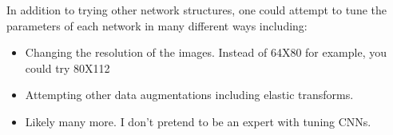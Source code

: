 \documentclass[letterpaper]{article}
\begin{document}
In addition to trying other network structures, one could attempt to tune the parameters of each network in many different ways including:
\begin{itemize}
  \item Changing the resolution of the images. Instead of 64X80 for example, you could try 80X112
  \item Attempting other data augmentations including elastic transforms. 
  \item Likely many more. I don't pretend to be an expert with tuning CNNs.
  
\end{itemize}


\end{document}
